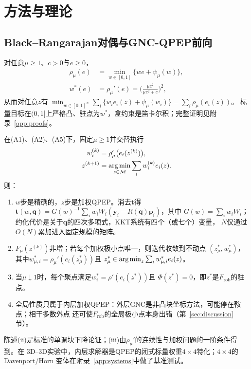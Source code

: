 \section{方法与理论}
\label{sec:method}

\subsection{Black--Rangarajan对偶与GNC-QPEP前向}

\begin{lemma}[GM的精确BR对偶]\label{lem:brdual}
对任意$\mu\ge1$、$c>0$与$e\ge0$，
\begin{equation}
\begin{aligned}
\rho_\mu(e)&=\min_{w\in[0,1]}\big\{we+\psi_\mu(w)\big\},\\
w^*(e)&=\rho_\mu'(e)=\Big(\frac{\mu c^2}{\mu c^2+e}\Big)^2,
\end{aligned}
\end{equation}
从而对任意$z$有
$\min_{w\in[0,1]^N}\sum_i\{w_ie_i(z)+\psi_\mu(w_i)\}=\sum_i\rho_\mu(e_i(z))$。
标量目标在$(0,1]$上严格凸、驻点为$w^*$，盒约束是笛卡尔积；完整证明见附录~\ref{app:proofs}。
\end{lemma}

\begin{theorem}\label{thm:gnc}
在(A1)、(A2)、(A5)下，固定$\mu\ge1$并交替执行
\begin{equation}
\begin{aligned}
w_i^{(k)}&=\rho_\mu'\big(e_i(z^{(k)})\big),\\
z^{(k+1)}&=\operatorname*{arg\,min}_{z\in\mathcal{M}}\sum_iw_i^{(k)}e_i(z).
\end{aligned}
\end{equation}
则：
\begin{enumerate}
\item[(i)] $w$步是精确的，$z$步是加权QPEP。消去$\mathbf{t}$得
  $\mathbf{t}(w,\mathbf{q})=G(w)^{-1}\sum_iw_iW_i(\mathbf{y}_i-R(\mathbf{q})\mathbf{p}_i)$，其中
  $G(w)=\sum_iw_iW_i$；约化代价是关于$\mathbf{q}$的四次多项式，KKT系统有四个（或七个）变量，
  $N$仅通过$O(N)$累加进入固定规模的矩阵。
\item[(ii)] $F_\mu(z^{(k)})$非增；若每个加权极小点唯一，则迭代收敛到不动点
  $(z_\mu^*,w_\mu^*)$，其中$w_{\mu,i}^*=\rho_\mu'(e_i(z_\mu^*))$且
  $z_\mu^*\in\operatorname*{arg\,min}_z\sum_iw_{\mu,i}^*e_i(z)$。
\item[(iii)] 当$\mu\downarrow1$时，每个聚点满足$w_i^*=\rho'(e_i(z^*))$且
  $\Phi(z^*)=0$，即$z^*$是$F_{\mathrm{rob}}$的驻点。
\item[(iv)] 全局性质只属于内层加权QPEP：外层GNC是非凸块坐标方法，可能停在鞍点；相干多数外点
  还可使$F_{\mathrm{rob}}$的全局极小点本身出错（第~\ref{sec:discussion}节）。
\end{enumerate}
陈述(ii)是标准的单调块下降论证；(iii)由$\rho_\mu'$的连续性与加权问题的一阶条件得到。在
3D--3D实验中，内层求解器是QPEP的闭式标量权重$4\times4$特化；$4\times4$的Davenport/Horn
变体在附录~\ref{app:systems}中做了基准测试。
\end{theorem}

